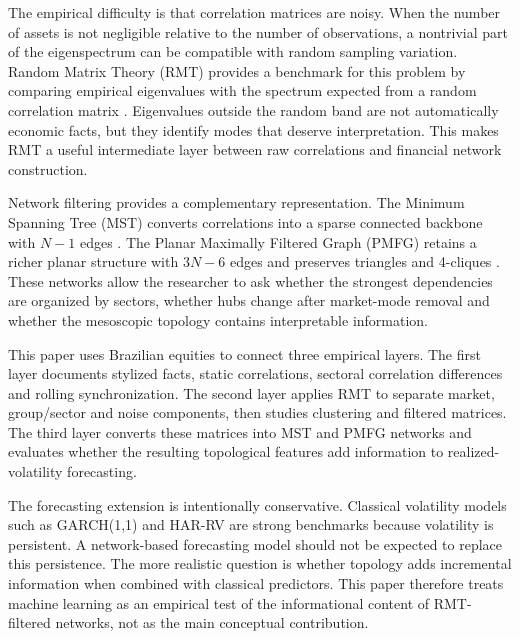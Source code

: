 The empirical difficulty is that correlation matrices are noisy. When the number of assets is not negligible relative to the number of observations, a nontrivial part of the eigenspectrum can be compatible with random sampling variation. Random Matrix Theory (RMT) provides a benchmark for this problem by comparing empirical eigenvalues with the spectrum expected from a random correlation matrix \cite{marcenko_1967_distribution,laloux_1999_noise,plerou_2002_random}. Eigenvalues outside the random band are not automatically economic facts, but they identify modes that deserve interpretation. This makes RMT a useful intermediate layer between raw correlations and financial network construction.

Network filtering provides a complementary representation. The Minimum Spanning Tree (MST) converts correlations into a sparse connected backbone with $N-1$ edges \cite{mantegna_1999_hierarchical}. The Planar Maximally Filtered Graph (PMFG) retains a richer planar structure with $3N-6$ edges and preserves triangles and 4-cliques \cite{tumminello_2005_tool}. These networks allow the researcher to ask whether the strongest dependencies are organized by sectors, whether hubs change after market-mode removal and whether the mesoscopic topology contains interpretable information.

This paper uses Brazilian equities to connect three empirical layers. The first layer documents stylized facts, static correlations, sectoral correlation differences and rolling synchronization. The second layer applies RMT to separate market, group/sector and noise components, then studies clustering and filtered matrices. The third layer converts these matrices into MST and PMFG networks and evaluates whether the resulting topological features add information to realized-volatility forecasting.

The forecasting extension is intentionally conservative. Classical volatility models such as GARCH(1,1) \cite{bollerslev_1986_generalized} and HAR-RV \cite{corsi_2009_simple} are strong benchmarks because volatility is persistent. A network-based forecasting model should not be expected to replace this persistence. The more realistic question is whether topology adds incremental information when combined with classical predictors. This paper therefore treats machine learning as an empirical test of the informational content of RMT-filtered networks, not as the main conceptual contribution.

